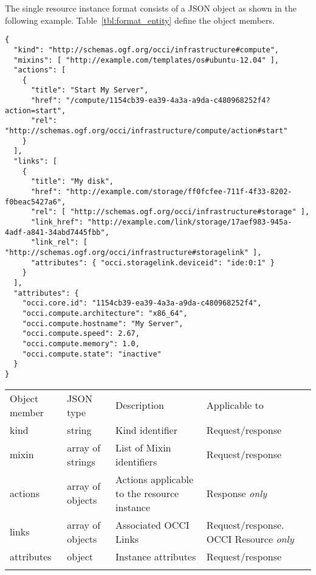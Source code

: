 \documentclass[10pt,a4paper]{article}
\begin{document}
The single resource instance format consists of a JSON object as shown in the
following example.
Table~\ref{tbl:format_entity} define the object members.
\begin{verbatim}
{
  "kind": "http://schemas.ogf.org/occi/infrastructure#compute",
  "mixins": [ "http://example.com/templates/os#ubuntu-12.04" ],
  "actions": [
    {
      "title": "Start My Server",
      "href": "/compute/1154cb39-ea39-4a3a-a9da-c480968252f4?action=start",
      "rel": "http://schemas.ogf.org/occi/infrastructure/compute/action#start"
    }
  ],
  "links": [
    {
      "title": "My disk",
      "href": "http://example.com/storage/ff0fcfee-711f-4f33-8202-f0beac5427a6",
      "rel": [ "http://schemas.ogf.org/occi/infrastructure#storage" ],
      "link_href": "http://example.com/link/storage/17aef983-945a-4adf-a841-34abd7445fbb",
      "link_rel": [ "http://schemas.ogf.org/occi/infrastructure#storagelink" ],
      "attributes": { "occi.storagelink.deviceid": "ide:0:1" }
    }
  ],
  "attributes": {
    "occi.core.id": "1154cb39-ea39-4a3a-a9da-c480968252f4",
    "occi.compute.architecture": "x86_64",
    "occi.compute.hostname": "My Server",
    "occi.compute.speed": 2.67,
    "occi.compute.memory": 1.0,
    "occi.compute.state": "inactive"
  }
}
\end{verbatim}
 {
    \begin{tabular}{llp{5.0cm}p{3.0cm}}
    \toprule
    Object member & JSON type & Description & Applicable to \\
    \colrule
    kind & string & Kind identifier & Request/response \\

    mixin & array of strings & List of Mixin identifiers &
    Request/response \\

    actions & array of objects & Actions applicable to the resource instance &
    Response {\em only} \\

    links & array of objects & Associated OCCI Links &
    Request/response. OCCI Resource {\em only} \\

    attributes & object & Instance attributes & Request/response \\
    \botrule
    \end{tabular}
}
\end{document}
